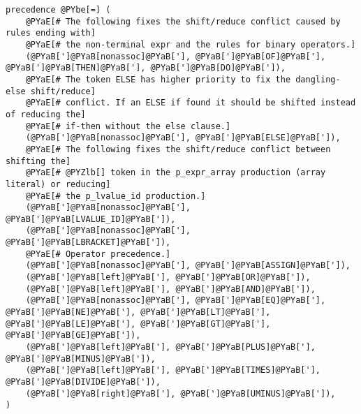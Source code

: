 \begin{Verbatim}[commandchars=@\[\]]
precedence @PYbe[=] (
    @PYaE[# The following fixes the shift/reduce conflict caused by rules ending with]
    @PYaE[# the non-terminal expr and the rules for binary operators.]
    (@PYaB[']@PYaB[nonassoc]@PYaB['], @PYaB[']@PYaB[OF]@PYaB['], @PYaB[']@PYaB[THEN]@PYaB['], @PYaB[']@PYaB[DO]@PYaB[']),
    @PYaE[# The token ELSE has higher priority to fix the dangling-else shift/reduce]
    @PYaE[# conflict. If an ELSE if found it should be shifted instead of reducing the]
    @PYaE[# if-then without the else clause.]
    (@PYaB[']@PYaB[nonassoc]@PYaB['], @PYaB[']@PYaB[ELSE]@PYaB[']),
    @PYaE[# The following fixes the shift/reduce conflict between shifting the]
    @PYaE[# @PYZlb[] token in the p_expr_array production (array literal) or reducing]
    @PYaE[# the p_lvalue_id production.]
    (@PYaB[']@PYaB[nonassoc]@PYaB['], @PYaB[']@PYaB[LVALUE_ID]@PYaB[']),
    (@PYaB[']@PYaB[nonassoc]@PYaB['], @PYaB[']@PYaB[LBRACKET]@PYaB[']),
    @PYaE[# Operator precedence.]
    (@PYaB[']@PYaB[nonassoc]@PYaB['], @PYaB[']@PYaB[ASSIGN]@PYaB[']),
    (@PYaB[']@PYaB[left]@PYaB['], @PYaB[']@PYaB[OR]@PYaB[']),
    (@PYaB[']@PYaB[left]@PYaB['], @PYaB[']@PYaB[AND]@PYaB[']),
    (@PYaB[']@PYaB[nonassoc]@PYaB['], @PYaB[']@PYaB[EQ]@PYaB['], @PYaB[']@PYaB[NE]@PYaB['], @PYaB[']@PYaB[LT]@PYaB['], @PYaB[']@PYaB[LE]@PYaB['], @PYaB[']@PYaB[GT]@PYaB['], @PYaB[']@PYaB[GE]@PYaB[']),
    (@PYaB[']@PYaB[left]@PYaB['], @PYaB[']@PYaB[PLUS]@PYaB['], @PYaB[']@PYaB[MINUS]@PYaB[']),
    (@PYaB[']@PYaB[left]@PYaB['], @PYaB[']@PYaB[TIMES]@PYaB['], @PYaB[']@PYaB[DIVIDE]@PYaB[']),
    (@PYaB[']@PYaB[right]@PYaB['], @PYaB[']@PYaB[UMINUS]@PYaB[']),
)
\end{Verbatim}
